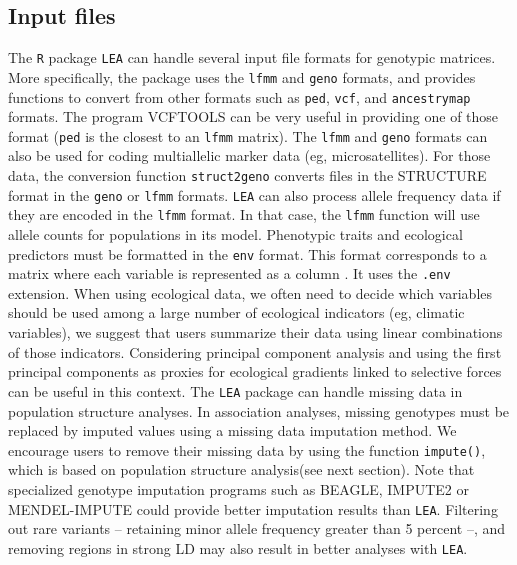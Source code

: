 \documentclass[12pt,a4paper,oneside]{article}\usepackage[]{graphicx}\usepackage[]{color}
\begin{document}
\subsection{Input files}
The {\tt R} package {\tt LEA} can handle several input file formats for genotypic matrices. More specifically, the package uses the {\tt lfmm} and {\tt geno} formats, and provides functions to convert from other formats such as {\tt ped}, {\tt vcf}, and {\tt ancestrymap} formats. The program VCFTOOLS can be very useful in providing one of those format ({\tt ped} is the closest to an {\tt lfmm} matrix).
\newline
\newline
The {\tt lfmm} and {\tt geno} formats can also be used for coding multiallelic marker data (eg, microsatellites). For those data, the conversion function {\tt struct2geno} converts files in the STRUCTURE format in the  {\tt geno} or {\tt lfmm} formats. {\tt LEA} can also process allele frequency data if they are encoded in the {\tt lfmm} format. In that case, the {\tt lfmm} function will use allele counts for populations in its model. 
\newline
\newline
Phenotypic traits and ecological predictors must be formatted in the {\tt env} format. This format corresponds to a matrix where each variable is represented as a column \citep{Frichot_2013}. It uses the {\tt .env} extension.
\newline
\newline
When using ecological data, we often need to decide which variables should be used among a large number of ecological indicators (eg, climatic variables), we suggest that users summarize their data using linear combinations of those indicators. Considering principal component analysis and using the first principal components as proxies for ecological gradients linked to selective forces can be useful in this context.
\newline
\newline
The {\tt LEA} package can handle missing data in population structure analyses. In association analyses, missing genotypes must be replaced by imputed values using a missing data imputation method. We encourage users to remove their missing data by using the function {\tt impute()}, which is based on population structure analysis(see next section). Note that specialized genotype imputation programs such as BEAGLE, IMPUTE2 or MENDEL-IMPUTE could provide better imputation results than {\tt LEA}. Filtering out rare variants -- retaining minor allele frequency greater than 5 percent --, and removing regions in strong LD may also result in better analyses with {\tt LEA}.
\end{document}
